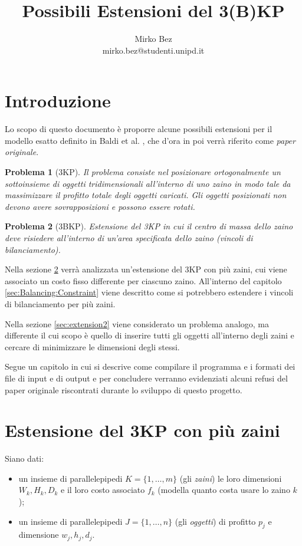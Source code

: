 \documentclass{scrartcl}
\title{Possibili Estensioni del 3(B)KP}
\author{Mirko Bez \\
	mirko.bez@studenti.unipd.it
	}
\newtheorem{problem}{Problema}
\begin{document}
\maketitle
\tableofcontents
\newpage
\section{Introduzione}
Lo scopo di questo documento è proporre alcune possibili estensioni per il modello esatto definito in Baldi et al. \cite{Baldi20129802}, che d'ora in poi verrà riferito come \emph{paper originale}.

\begin{problem}[3KP]
Il problema consiste nel posizionare ortogonalmente un sottoinsieme di oggetti tridimensionali all'interno di uno zaino in modo tale da massimizzare il profitto totale degli oggetti caricati. 
Gli oggetti posizionati non devono avere sovrapposizioni e possono essere rotati.
\end{problem}

\begin{problem}[3BKP]
	Estensione del 3KP in cui il centro di massa dello zaino deve risiedere all'interno di un'area specificata dello zaino (vincoli di bilanciamento).
\end{problem}

Nella sezione \ref{sec:extension1} verrà analizzata un'estensione del 3KP con più zaini, cui viene associato un costo fisso differente per ciascuno zaino. All'interno del capitolo \ref{sec:Balancing:Constraint} viene descritto come si potrebbero estendere i vincoli di bilanciamento per più zaini. 

Nella sezione \ref{sec:extension2} viene considerato un problema analogo, ma differente il cui scopo è quello di inserire tutti gli oggetti all'interno degli zaini e cercare di minimizzare le dimensioni degli stessi. 

Segue un capitolo in cui si descrive come compilare il programma e i formati dei file di input e di output e per concludere verranno evidenziati alcuni refusi del paper originale riscontrati durante lo sviluppo di questo progetto.  

\section{Estensione del 3KP con più zaini}
\label{sec:extension1}

Siano dati:
\begin{itemize} 
	
	\item un insieme di parallelepipedi $K = \{1, \dots, m \}$ (gli \emph{zaini}) le loro dimensioni $W_k, H_k, D_k$ e il loro costo associato $f_k$ (modella quanto costa usare lo zaino $k$);
	\item un insieme di parallelepipedi $J = \{1, \dots, n\}$ (gli \emph{oggetti}) di profitto $p_j$ e dimensione $w_j, h_j, d_j$.
\end{itemize}
\end{document}
